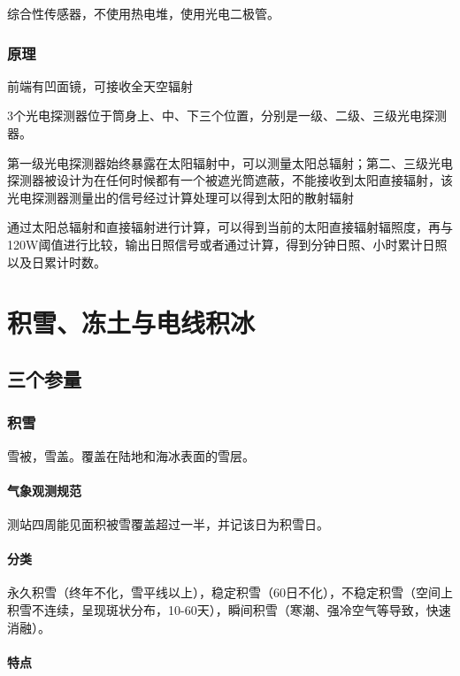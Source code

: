 \documentclass[UTF8,11pt]{ctexbook}
\begin{document}
综合性传感器，不使用热电堆，使用光电二极管。

\subsection{原理}

前端有凹面镜，可接收全天空辐射

3个光电探测器位于筒身上、中、下三个位置，分别是一级、二级、三级光电探测器。

第一级光电探测器始终暴露在太阳辐射中，可以测量太阳总辐射；第二、三级光电探测器被设计为在任何时候都有一个被遮光筒遮蔽，不能接收到太阳直接辐射，该光电探测器测量出的信号经过计算处理可以得到太阳的散射辐射

通过太阳总辐射和直接辐射进行计算，可以得到当前的太阳直接辐射辐照度，再与120W阈值进行比较，输出日照信号或者通过计算，得到分钟日照、小时累计日照以及日累计时数。

\chapter{积雪、冻土与电线积冰}

\section{三个参量}

\subsection{积雪}

雪被，雪盖。覆盖在陆地和海冰表面的雪层。

\subsubsection{气象观测规范}

测站四周能见面积被雪覆盖超过一半，并记该日为积雪日。

\subsubsection{分类}

永久积雪（终年不化，雪平线以上），稳定积雪（60日不化），不稳定积雪（空间上积雪不连续，呈现斑状分布，10-60天），瞬间积雪（寒潮、强冷空气等导致，快速消融）。

\subsubsection{特点}
\end{document}
